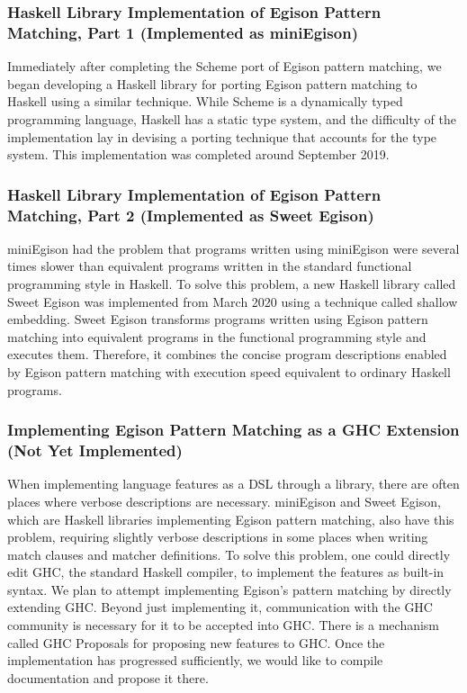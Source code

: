 \subsubsection{Haskell Library Implementation of Egison Pattern Matching, Part 1 (Implemented as miniEgison)}\label{direction-language-haskell1}

Immediately after completing the Scheme port of Egison pattern matching, we began developing a Haskell library for porting Egison pattern matching to Haskell using a similar technique.
While Scheme is a dynamically typed programming language, Haskell has a static type system, and the difficulty of the implementation lay in devising a porting technique that accounts for the type system.
This implementation was completed around September 2019.

\subsubsection{Haskell Library Implementation of Egison Pattern Matching, Part 2 (Implemented as Sweet Egison)}\label{direction-language-haskell2}

miniEgison had the problem that programs written using miniEgison were several times slower than equivalent programs written in the standard functional programming style in Haskell.
To solve this problem, a new Haskell library called Sweet Egison was implemented from March 2020 using a technique called shallow embedding.
Sweet Egison transforms programs written using Egison pattern matching into equivalent programs in the functional programming style and executes them.
Therefore, it combines the concise program descriptions enabled by Egison pattern matching with execution speed equivalent to ordinary Haskell programs.

\subsubsection{Implementing Egison Pattern Matching as a GHC Extension (Not Yet Implemented)}\label{direction-language-ghc}

When implementing language features as a DSL through a library, there are often places where verbose descriptions are necessary.
miniEgison and Sweet Egison, which are Haskell libraries implementing Egison pattern matching, also have this problem, requiring slightly verbose descriptions in some places when writing match clauses and matcher definitions.
To solve this problem, one could directly edit GHC, the standard Haskell compiler, to implement the features as built-in syntax.
We plan to attempt implementing Egison's pattern matching by directly extending GHC.
Beyond just implementing it, communication with the GHC community is necessary for it to be accepted into GHC.
There is a mechanism called GHC Proposals for proposing new features to GHC.
Once the implementation has progressed sufficiently, we would like to compile documentation and propose it there.

